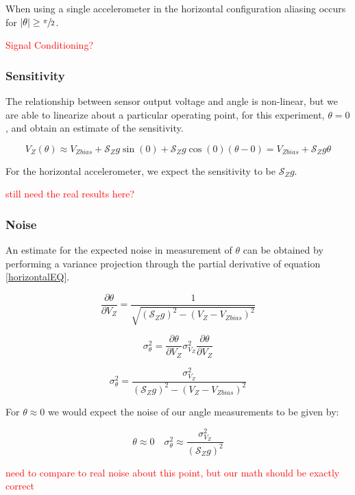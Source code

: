 \documentclass{article}
\newcommand{\xxx}[1]{\textcolor{red}{#1}}
\theoremstyle{plain}
\theoremstyle{definition}
\theoremstyle{remark}
\newcommand{\Sens}{\mathcal{S}}
\begin{document}
When using a single accelerometer in the horizontal configuration aliasing occurs for $|\theta| \geq \sfrac{\pi}{2}$.

\xxx{Signal Conditioning?}

\subsubsection{Sensitivity}

The relationship between sensor output voltage and angle is non-linear, but we are able to linearize about a particular operating point, for this experiment, $\theta = 0$, and obtain an estimate of the sensitivity.

$$ V_{Z}(\theta) \approx V_{Zbias} + \Sens_{Z} g \sin(0) + \Sens_{Z} g \cos(0) \left(\theta - 0\right) = V_{Zbias} + \Sens_{Z} g \theta $$

For the horizontal accelerometer, we expect the sensitivity to be $\Sens_{Z} g$. 

\xxx{still need the real results here?}

\subsubsection{Noise}

An estimate for the expected noise in measurement of $\theta$ can be obtained by performing a variance projection through the partial derivative of equation \ref{horizontalEQ}.

$$ \frac{\partial \theta}{\partial V_{Z}} =  \frac{1}{\sqrt{(\Sens_{Z} g)^2 - (V_{Z} - V_{Zbias})^2}}$$

$$ \sigma^2_{\theta} = \frac{\partial \theta}{\partial V_{Z}} \sigma^2_{V_{Z}} \frac{\partial \theta}{\partial V_{Z}} $$

$$ \sigma^2_{\theta} = \frac{\sigma^2_{V_{Z}}}{(\Sens_{Z} g)^2 - (V_{Z} - V_{Zbias})^2}$$

For $\theta \approx 0$ we would expect the noise of our angle measurements to be given by:

$$ \theta \approx 0 \quad \sigma^2_{\theta} \approx \frac{\sigma^2_{V_{Z}}}{(\Sens_{Z} g)^2}$$

\xxx{need to compare to real noise about this point, but our math should be exactly correct}
\end{document}
